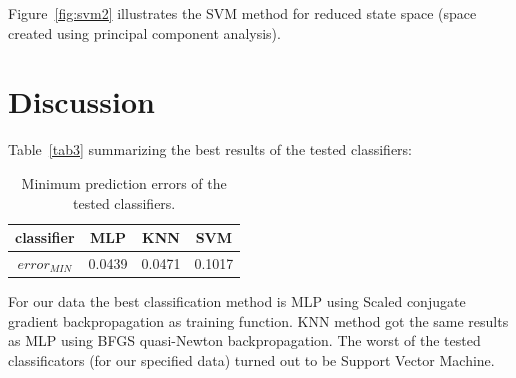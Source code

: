\documentclass[
10pt, %
a4paper, %
oneside, %
headinclude,footinclude, %
BCOR5mm, %
]{scrartcl}
\begin{document}
Figure~\vref{fig:svm2} illustrates the SVM method for reduced state space (space created using principal component analysis).


\section{Discussion}

Table~\vref{tab3} summarizing the best results of the tested classifiers:

\begin{table}[H]
	\centering
	\begin{tabular}{ c | c | c | c  }
    classifier  & MLP & KNN & SVM \\ \hline
    $ error_{MIN} $ & \cellcolor{amber!25}0.0439 & 0.0471 & 0.1017 \\
  	\end{tabular}
  	\caption{Minimum prediction errors of the tested classifiers.}
  	\label{tab3}
\end{table}

For our data the best classification method is MLP using Scaled conjugate gradient backpropagation as training function. KNN method got the same results as MLP using BFGS quasi-Newton backpropagation. The worst of the tested classificators (for our specified data) turned out to be Support Vector Machine.


\renewcommand{\refname}{\spacedlowsmallcaps{References}} %




\end{document}
